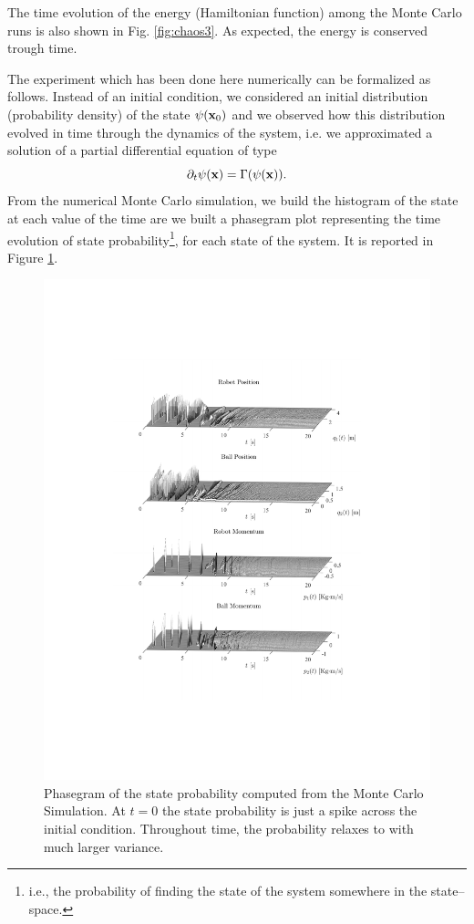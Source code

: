 The time evolution of the energy (Hamiltonian function) among the Monte Carlo runs is also shown in Fig. \ref{fig:chaos3}. As expected, the energy is conserved trough time.
%

%
The experiment which has been done here numerically can be formalized as follows.
Instead of an initial condition, we considered an initial distribution (probability density) of the state $\psi(\mathbf{x}_0)$ and we observed how this distribution evolved in time through the dynamics of the system, i.e. we approximated a solution of a partial differential equation of type
%
\begin{equation}
    \partial_t\psi(\mathbf{x}) = \Gamma(\psi(\mathbf{x})).
\end{equation}
%
From the numerical Monte Carlo simulation, we build the histogram of the state at each value of the time are we built a phasegram plot representing the time evolution of state probability\footnote{i.e., the probability of finding the state of the system somewhere in the state--space.}, for each state of the system. It is reported in Figure \ref{fig:phasegram}. 
%
\begin{figure}[h]
    \centering
    \includegraphics[width = 1\linewidth, trim={5cm 5.75cm 3.9cm 5.5cm},clip]{Figures/PhaseGram.pdf}
    \caption[Phasegram of the state probability function]{Phasegram of the state probability computed from the Monte Carlo Simulation. At $t=0$ the state probability is just a spike across the initial condition. Throughout time, the probability relaxes to with much larger variance.}
    \label{fig:phasegram}
\end{figure}

